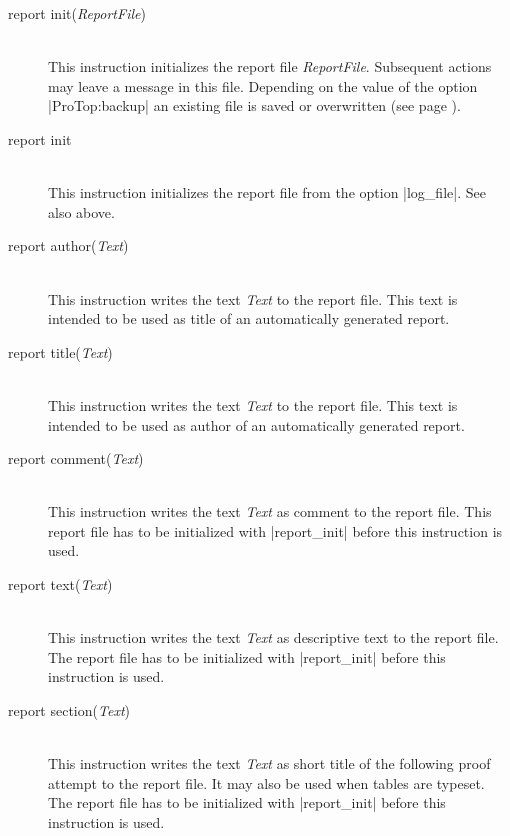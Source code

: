 \begin{description}
  \item [report init({\em ReportFile})]\ \\
  This instruction initializes the report file {\em ReportFile}. Subsequent
  actions may leave a message in this file. Depending on the value of the
  option |ProTop:backup| an existing file is saved or overwritten (see page
  \pageref{ProTop:backup}).

  \item [report init]\ \\
  This instruction initializes the report file from the option |log_file|. See
  also above.

  \item [report author({\em Text})]\ \\
  This instruction writes the text {\em Text} to the report file. This text is
  intended to be used as title of an automatically generated report.

  \item [report title({\em Text})]\ \\
  This instruction writes the text {\em Text} to the report file. This text is
  intended to be used as author of an automatically generated report.

  \item [report comment({\em Text})]\ \\
  This instruction writes the text {\em Text} as comment to the report file.
  This report file has to be initialized with |report_init| before this
  instruction is used.

  \item [report text({\em Text})]\ \\
  This instruction writes the text {\em Text} as descriptive text to the
  report file. The report file has to be initialized with |report_init|
  before this instruction is used. 

  \item [report section({\em Text})]\ \\
  This instruction writes the text {\em Text} as short title of the following
  proof attempt to the report file. It may also be used when tables are
  typeset.  The report file has to be initialized with |report_init|
  before this instruction is used. 


\end{description}
